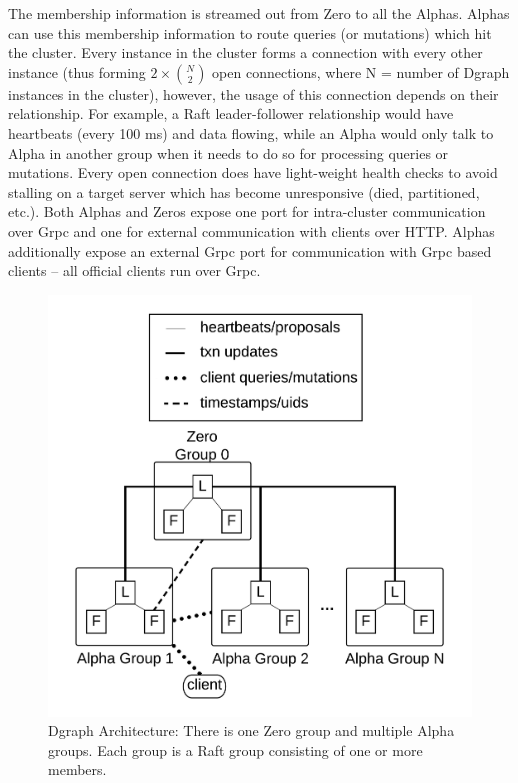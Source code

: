 \documentclass[letterpaper,twocolumn,10pt]{article}
\begin{document}
The membership information is streamed out from Zero to all the Alphas. Alphas
can use this membership information to route queries (or mutations) which hit
the cluster. Every instance in the cluster forms a connection with every other
instance (thus forming $2 \times \binom{N}{2}$ open connections, where N =
number of Dgraph instances in the cluster), however, the usage of this
connection depends on their relationship. For example, a Raft leader-follower
relationship would have heartbeats (every 100 ms) and data flowing, while an
Alpha would only talk to Alpha in another group when it needs to do so for
processing queries or mutations. Every open connection does have light-weight
health checks to avoid stalling on a target server which has become unresponsive
(died, partitioned, etc.). Both Alphas and Zeros expose one port for
intra-cluster communication over Grpc\cite{grpc} and one for external communication with
clients over HTTP. Alphas additionally expose an external Grpc port for
communication with Grpc based clients -- all official clients run over Grpc.

\begin{figure}[t]
\begin{center}
	\includegraphics[scale=0.5]{architecture.png}
\end{center}
\caption{Dgraph Architecture: There is one Zero group and multiple Alpha
groups. Each group is a Raft group consisting of one or more members.}
\end{figure}
\end{document}
